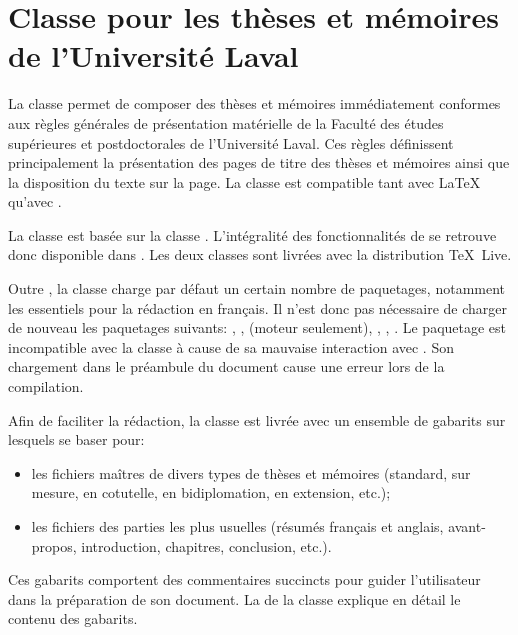 
\chapter{Classe pour les thèses et mémoires de
  l'Université Laval}
\label{chap:ulthese}

La classe  \citep{ulthese} permet de composer des
thèses et mémoires immédiatement conformes aux règles générales de
présentation matérielle de la Faculté des études supérieures et
postdoctorales de l'Université Laval. Ces règles définissent
principalement la présentation des pages de titre des thèses et
mémoires ainsi que la disposition du texte sur la page. La classe est
compatible tant avec {\LaTeX} qu'avec {\XeLaTeX}.

La classe  est basée sur la classe .
L'intégralité des fonctionnalités de  se retrouve donc
disponible dans . Les deux classes sont livrées avec la
distribution {\TeX}~Live.

Outre , la classe charge par défaut un certain nombre de
paquetages, notamment les essentiels pour la rédaction en français. Il
n'est donc pas nécessaire de charger de nouveau les paquetages
suivants: , ,  
(moteur {\XeLaTeX} seulement), , ,
. Le paquetage  est incompatible avec la
classe à cause de sa mauvaise interaction avec . Son
chargement dans le préambule du document cause une erreur lors de la
compilation.

Afin de faciliter la rédaction, la classe est livrée avec un ensemble
de gabarits sur lesquels se baser pour:
\begin{itemize}
\item les fichiers maîtres de divers types de thèses et mémoires
  (standard, sur mesure, en cotutelle, en bidiplomation, en
  extension, etc.);
\item les fichiers des parties les plus usuelles (résumés français
  et anglais, avant-propos, introduction, chapitres, conclusion,
  etc.).
\end{itemize}
Ces gabarits comportent des commentaires succincts pour guider
l'utilisateur dans la préparation de son document. La
de la classe explique en détail le contenu des gabarits.

